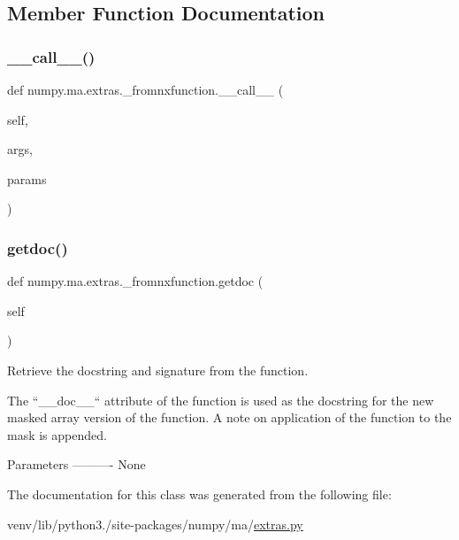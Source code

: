 \subsection{Member Function Documentation}
\mbox{\label{classnumpy_1_1ma_1_1extras_1_1__fromnxfunction_aef93b45d04cbebd30b63328fe22f257c}} 
\subsubsection{\texorpdfstring{\+\_\+\+\_\+call\+\_\+\+\_\+()}{\_\_call\_\_()}}
{\footnotesize\ttfamily def numpy.\+ma.\+extras.\+\_\+fromnxfunction.\+\_\+\+\_\+call\+\_\+\+\_\+ (\begin{DoxyParamCaption}\item[{}]{self,  }\item[{}]{args,  }\item[{}]{params }\end{DoxyParamCaption})}

\mbox{\label{classnumpy_1_1ma_1_1extras_1_1__fromnxfunction_a6a5d4aa51ed9538931dbc5918d9e156a}} 
\subsubsection{\texorpdfstring{getdoc()}{getdoc()}}
{\footnotesize\ttfamily def numpy.\+ma.\+extras.\+\_\+fromnxfunction.\+getdoc (\begin{DoxyParamCaption}\item[{}]{self }\end{DoxyParamCaption})}

\begin{DoxyVerb}Retrieve the docstring and signature from the function.

The ``__doc__`` attribute of the function is used as the docstring for
the new masked array version of the function. A note on application
of the function to the mask is appended.

Parameters
----------
None\end{DoxyVerb}
 

The documentation for this class was generated from the following file\+:\begin{DoxyCompactItemize}
\item 
venv/lib/python3./site-\/packages/numpy/ma/\hyperlink{extras_8py}{extras.\+py}\end{DoxyCompactItemize}
